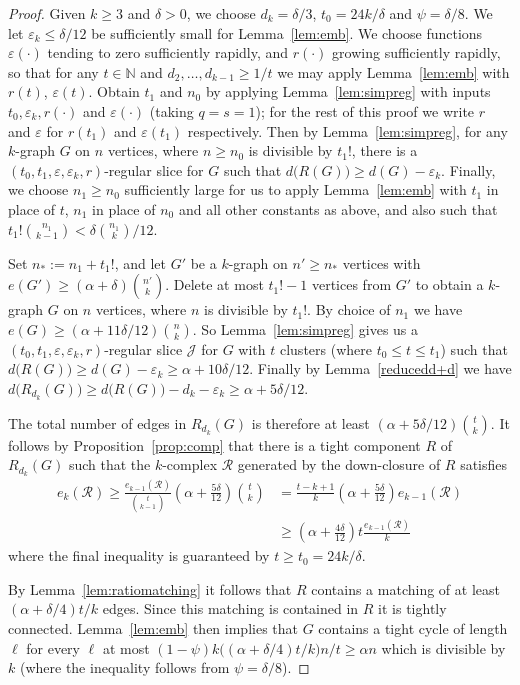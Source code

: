 \documentclass[12pt,a4paper]{amsart}
\let\eps\varepsilon
\newcommand{\NATS}{\mathbb{N}}
\newcommand{\cR}{\mathcal{R}}
\newcommand{\cJ}{\mathcal{J}}
\begin{document}
\begin{proof}
  Given $k \geq 3$ and $\delta>0$, we choose $d_k=\delta/3$, $t_0=24k/\delta$ and $\psi = \delta/8$. We let
  $\eps_k\le\delta/12$ be sufficiently small for Lemma~\ref{lem:emb}. We choose
  functions $\eps(\cdot)$ tending to zero sufficiently rapidly,
  and $r(\cdot)$ growing sufficiently rapidly, so that for any $t \in
  \NATS$ and $d_2, \dots, d_{k-1} \geq 1/t$ we may apply
  Lemma~\ref{lem:emb} with $r(t)$, $\eps(t)$. Obtain
  $t_1$ and $n_0$ by applying Lemma~\ref{lem:simpreg} with inputs
  $t_0, \eps_k, r(\cdot)$ and $\eps(\cdot)$ (taking $q=s=1$); for the rest of
  this proof we write $r$ and $\eps$ for $r(t_1)$ and $\eps(t_1)$
  respectively. Then by Lemma~\ref{lem:simpreg}, for any $k$-graph $G$ on $n$
  vertices, where $n\ge  n_0$ is divisible by $t_1!$, there is a
  $(t_0, t_1,\eps,\eps_k, r)$-regular slice for $G$ such that
  $d\big(R(G)\big)\ge d(G)-\eps_k$. Finally, we choose $n_1 \geq n_0$ sufficiently large for us to apply Lemma~\ref{lem:emb} with
 $t_1$ in place of $t$, $n_1$ in place of $n_0$ and all other constants as above, and also such that
  $t_1!\binom{n_1}{k-1}<\delta\binom{n_1}{k}/12$.
  
  Set $n_* := n_1 + t_1!$, and let $G'$ be a $k$-graph on $n'\ge n_*$
  vertices with $e(G')\ge(\alpha+\delta)\binom{n'}{k}$. Delete at most
  $t_1!-1$ vertices from $G'$ to obtain a $k$-graph $G$ on $n$ vertices,
  where $n$ is divisible by $t_1!$. By choice of $n_1$ we have
  $e(G)\ge(\alpha+11\delta/12)\binom{n}{k}$. So Lemma~\ref{lem:simpreg}
   gives us a $(t_0,t_1, \eps, \eps_k, r)$-regular slice $\cJ$ for
   $G$ with $t$ clusters (where $t_0 \leq t \leq t_1$)
   such that $d\big(R(G)\big)\ge d(G)-\eps_k\ge \alpha+10\delta/12$. Finally by Lemma~\ref{reducedd+d} we have
  $d\big(R_{d_k}(G)\big)\ge d\big(R(G)\big)-d_k-\eps_k\ge \alpha+5\delta/12$.
  
  The total number of edges in $R_{d_k}(G)$ is therefore at least
  $(\alpha+5\delta/12)\binom{t}{k}$. It follows by
  Proposition~\ref{prop:comp} that there is a tight component $R$ of
  $R_{d_k}(G)$ such that the $k$-complex $\cR$ generated by the down-closure
  of $R$ satisfies
  \begin{align*}
    e_k(\cR) \ge
  \frac{e_{k-1}(\cR)}{\binom{t}{k-1}}\left(\alpha+\frac{5\delta}{12}\right)\binom{t}{k}&=
  \frac{t-k+1}{k}\left(\alpha+\frac{5\delta}{12}\right)e_{k-1}(\cR) \\
  &\ge \left(\alpha+\frac{4\delta}{12}\right)t \frac{e_{k-1}(\cR)}{k}
  \end{align*} 
  where the final inequality is guaranteed by $t \ge t_0 = 24k/\delta$.
  
  By Lemma~\ref{lem:ratiomatching} it follows that $R$ contains a matching of at
  least $(\alpha+\delta/4)t/k$ edges. Since this matching is contained in
  $R$ it is tightly connected. Lemma~\ref{lem:emb} then implies that $G$
  contains a tight cycle of length $\ell$ for every $\ell$ at most
  $(1-\psi)k\big((\alpha+\delta/4)t/k\big)n/t\ge\alpha n$ which is
  divisible by $k$ (where the inequality follows from $\psi=\delta/8$).
\end{proof}
\end{document}
